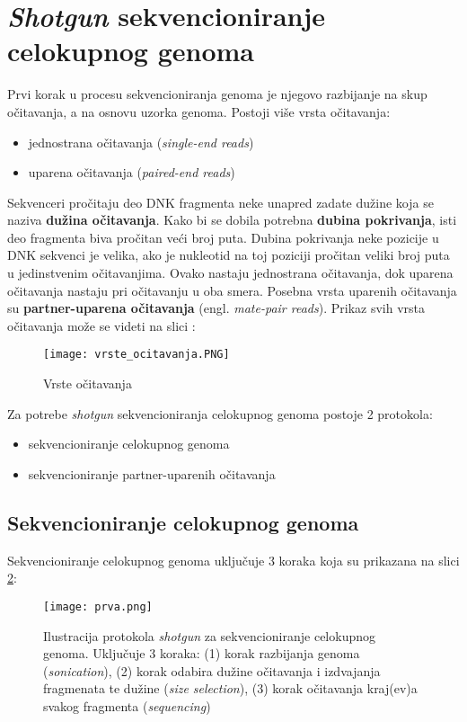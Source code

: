 \documentclass[12pt,oneside]{memoir}
\begin{document}
\newpage

\section{\textit{Shotgun} sekvencioniranje celokupnog genoma}

Prvi korak u procesu sekvencioniranja genoma je njegovo razbijanje na skup očitavanja, a na osnovu uzorka genoma. Postoji više vrsta očitavanja:
\begin{itemize}
    \item {jednostrana očitavanja (\textit{single-end reads})}
    \item {uparena očitavanja (\textit{paired-end reads})}
\end{itemize}
Sekvenceri pročitaju deo DNK fragmenta neke unapred
zadate dužine koja se naziva \textbf{dužina očitavanja}. Kako bi se dobila potrebna \textbf{dubina pokrivanja}, isti deo fragmenta biva pročitan veći broj puta. Dubina pokrivanja neke pozicije u DNK sekvenci je velika, ako je nukleotid na toj poziciji pročitan veliki broj puta u jedinstvenim očitavanjima. Ovako nastaju jednostrana očitavanja, dok uparena očitavanja nastaju pri očitavanju u oba smera. Posebna vrsta uparenih očitavanja su \textbf{partner-uparena očitavanja} (engl. \textit{mate-pair reads}). Prikaz svih vrsta očitavanja može se videti na slici \label{fig:01}:

\begin{figure}[!ht]
  \centering
  \texttt{[image: vrste\_ocitavanja.PNG]}
  \caption{Vrste očitavanja}
  \label{fig:01}
\end{figure}

Za potrebe \textit{shotgun} sekvencioniranja celokupnog genoma postoje 2 protokola: 
\begin{itemize}
    \item {sekvencioniranje celokupnog genoma}
    \item {sekvencioniranje partner-uparenih očitavanja}
\end{itemize}

\newpage

\subsection{Sekvencioniranje celokupnog genoma}

Sekvencioniranje celokupnog genoma uključuje 3 koraka koja su prikazana na slici \ref{fig:1}:

\begin{figure}[!ht]
  \centering
  \texttt{[image: prva.png]}
  \caption{Ilustracija protokola \textit{shotgun} za sekvencioniranje celokupnog genoma.
Uključuje 3 koraka: (1) korak razbijanja genoma (\textit{sonication}), (2)
korak odabira dužine očitavanja i izdvajanja fragmenata te dužine (\textit{size selection}), (3) korak očitavanja kraj(ev)a svakog fragmenta (\textit{sequencing})}
\label{fig:1}
\end{figure}
\end{document}
